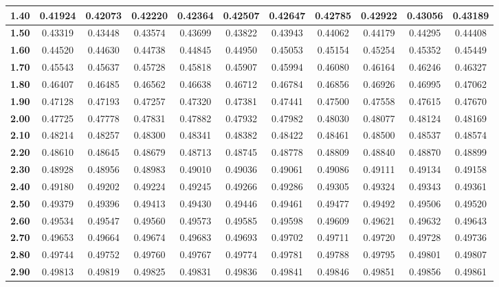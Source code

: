 \begin{tabular}{|c|c|c|c|c|c|c|c|c|c|c|}
\hline
\textbf{ 1.40 } & 0.41924 & 0.42073 & 0.42220 & 0.42364 & 0.42507 & 0.42647 & 0.42785 & 0.42922 & 0.43056 & 0.43189\\ 
\hline
\textbf{ 1.50 } & 0.43319 & 0.43448 & 0.43574 & 0.43699 & 0.43822 & 0.43943 & 0.44062 & 0.44179 & 0.44295 & 0.44408\\ 
\hline
\textbf{ 1.60 } & 0.44520 & 0.44630 & 0.44738 & 0.44845 & 0.44950 & 0.45053 & 0.45154 & 0.45254 & 0.45352 & 0.45449\\ 
\hline
\textbf{ 1.70 } & 0.45543 & 0.45637 & 0.45728 & 0.45818 & 0.45907 & 0.45994 & 0.46080 & 0.46164 & 0.46246 & 0.46327\\ 
\hline
\textbf{ 1.80 } & 0.46407 & 0.46485 & 0.46562 & 0.46638 & 0.46712 & 0.46784 & 0.46856 & 0.46926 & 0.46995 & 0.47062\\ 
\hline
\textbf{ 1.90 } & 0.47128 & 0.47193 & 0.47257 & 0.47320 & 0.47381 & 0.47441 & 0.47500 & 0.47558 & 0.47615 & 0.47670\\ 
\hline
\textbf{ 2.00 } & 0.47725 & 0.47778 & 0.47831 & 0.47882 & 0.47932 & 0.47982 & 0.48030 & 0.48077 & 0.48124 & 0.48169\\ 
\hline
\textbf{ 2.10 } & 0.48214 & 0.48257 & 0.48300 & 0.48341 & 0.48382 & 0.48422 & 0.48461 & 0.48500 & 0.48537 & 0.48574\\ 
\hline
\textbf{ 2.20 } & 0.48610 & 0.48645 & 0.48679 & 0.48713 & 0.48745 & 0.48778 & 0.48809 & 0.48840 & 0.48870 & 0.48899\\ 
\hline
\textbf{ 2.30 } & 0.48928 & 0.48956 & 0.48983 & 0.49010 & 0.49036 & 0.49061 & 0.49086 & 0.49111 & 0.49134 & 0.49158\\ 
\hline
\textbf{ 2.40 } & 0.49180 & 0.49202 & 0.49224 & 0.49245 & 0.49266 & 0.49286 & 0.49305 & 0.49324 & 0.49343 & 0.49361\\ 
\hline
\textbf{ 2.50 } & 0.49379 & 0.49396 & 0.49413 & 0.49430 & 0.49446 & 0.49461 & 0.49477 & 0.49492 & 0.49506 & 0.49520\\ 
\hline
\textbf{ 2.60 } & 0.49534 & 0.49547 & 0.49560 & 0.49573 & 0.49585 & 0.49598 & 0.49609 & 0.49621 & 0.49632 & 0.49643\\ 
\hline
\textbf{ 2.70 } & 0.49653 & 0.49664 & 0.49674 & 0.49683 & 0.49693 & 0.49702 & 0.49711 & 0.49720 & 0.49728 & 0.49736\\ 
\hline
\textbf{ 2.80 } & 0.49744 & 0.49752 & 0.49760 & 0.49767 & 0.49774 & 0.49781 & 0.49788 & 0.49795 & 0.49801 & 0.49807\\ 
\hline
\textbf{ 2.90 } & 0.49813 & 0.49819 & 0.49825 & 0.49831 & 0.49836 & 0.49841 & 0.49846 & 0.49851 & 0.49856 & 0.49861\\ 
\hline
\end{tabular}
